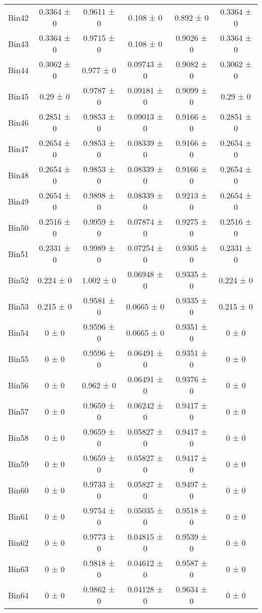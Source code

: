 \begin{tabular}{@{\extracolsep{4pt}}lccccc@{}}
     Bin42 & 0.3364 ± 0 & 0.9611 ± 0 & 0.108 ± 0 & 0.892 ± 0 & 0.3364 ± 0 \\ 
     Bin43 & 0.3364 ± 0 & 0.9715 ± 0 & 0.108 ± 0 & 0.9026 ± 0 & 0.3364 ± 0 \\ 
     Bin44 & 0.3062 ± 0 & 0.977 ± 0 & 0.09743 ± 0 & 0.9082 ± 0 & 0.3062 ± 0 \\ 
     Bin45 & 0.29 ± 0 & 0.9787 ± 0 & 0.09181 ± 0 & 0.9099 ± 0 & 0.29 ± 0 \\ 
     Bin46 & 0.2851 ± 0 & 0.9853 ± 0 & 0.09013 ± 0 & 0.9166 ± 0 & 0.2851 ± 0 \\ 
     Bin47 & 0.2654 ± 0 & 0.9853 ± 0 & 0.08339 ± 0 & 0.9166 ± 0 & 0.2654 ± 0 \\ 
     Bin48 & 0.2654 ± 0 & 0.9853 ± 0 & 0.08339 ± 0 & 0.9166 ± 0 & 0.2654 ± 0 \\ 
     Bin49 & 0.2654 ± 0 & 0.9898 ± 0 & 0.08339 ± 0 & 0.9213 ± 0 & 0.2654 ± 0 \\ 
     Bin50 & 0.2516 ± 0 & 0.9959 ± 0 & 0.07874 ± 0 & 0.9275 ± 0 & 0.2516 ± 0 \\ 
     Bin51 & 0.2331 ± 0 & 0.9989 ± 0 & 0.07254 ± 0 & 0.9305 ± 0 & 0.2331 ± 0 \\ 
     Bin52 & 0.224 ± 0 & 1.002 ± 0 & 0.06948 ± 0 & 0.9335 ± 0 & 0.224 ± 0 \\ 
     Bin53 & 0.215 ± 0 & 0.9581 ± 0 & 0.0665 ± 0 & 0.9335 ± 0 & 0.215 ± 0 \\ 
     Bin54 & 0 ± 0 & 0.9596 ± 0 & 0.0665 ± 0 & 0.9351 ± 0 & 0 ± 0 \\ 
     Bin55 & 0 ± 0 & 0.9596 ± 0 & 0.06491 ± 0 & 0.9351 ± 0 & 0 ± 0 \\ 
     Bin56 & 0 ± 0 & 0.962 ± 0 & 0.06491 ± 0 & 0.9376 ± 0 & 0 ± 0 \\ 
     Bin57 & 0 ± 0 & 0.9659 ± 0 & 0.06242 ± 0 & 0.9417 ± 0 & 0 ± 0 \\ 
     Bin58 & 0 ± 0 & 0.9659 ± 0 & 0.05827 ± 0 & 0.9417 ± 0 & 0 ± 0 \\ 
     Bin59 & 0 ± 0 & 0.9659 ± 0 & 0.05827 ± 0 & 0.9417 ± 0 & 0 ± 0 \\ 
     Bin60 & 0 ± 0 & 0.9733 ± 0 & 0.05827 ± 0 & 0.9497 ± 0 & 0 ± 0 \\ 
     Bin61 & 0 ± 0 & 0.9754 ± 0 & 0.05035 ± 0 & 0.9518 ± 0 & 0 ± 0 \\ 
     Bin62 & 0 ± 0 & 0.9773 ± 0 & 0.04815 ± 0 & 0.9539 ± 0 & 0 ± 0 \\ 
     Bin63 & 0 ± 0 & 0.9818 ± 0 & 0.04612 ± 0 & 0.9587 ± 0 & 0 ± 0 \\ 
     Bin64 & 0 ± 0 & 0.9862 ± 0 & 0.04128 ± 0 & 0.9634 ± 0 & 0 ± 0 \\ 

\end{tabular}
